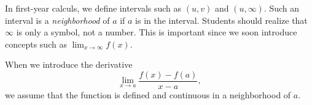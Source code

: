 \documentclass{sample}
\begin{document}
In first-year calculs, we define intervals such as $(u,v)$ and $(u,\infty)$.
Such an interval is a \emph{neighborhood} of $a$ if $a$ is in the interval.
Students should realize that $\infty$ is only a symbol, not a number.
This is important since we soon introduce concepts such as $\lim_{x \to \infty}f(x)$.

When we introduce the derivative
\[
    \lim_{x \to a} \frac{f(x) - f(a)}{x-a},
\]
we assume that the function is defined and continuous in a neighborhood of $a$.
\end{document}
